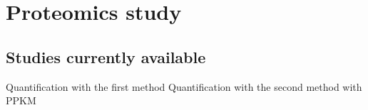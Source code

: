 \chapter{Proteomics study}
\label{sec:proteomics}

\section{Studies currently available}



Quantification with the first method
Quantification with the second method with PPKM
